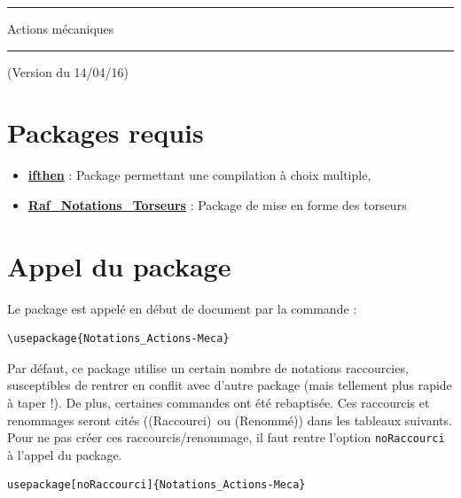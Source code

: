 \documentclass[a4paper,12pt]{article}
\newcommand{\rac}{({\color{red}Raccourci})}
\newcommand{\ren}{({\color{blue}Renommé})}
\begin{document}
	\begin{center}
		\hrule{\Large Actions mécaniques}\\\hrule
	\end{center}

(Version du 14/04/16)

	\section{Packages requis}

	\begin{itemize}
		\item \href{http://www.ctan.org/pkg/ifthen}{\textbf{ifthen}} : Package permettant une compilation à choix multiple,
		\item \href{http://www.ctan.org/pkg/color}{\textbf{Raf\_Notations\_Torseurs}} : Package de mise en forme des torseurs
	\end{itemize}

	\section{Appel du package}

	Le package est appelé en début de document par la commande :
	\begin{verbatim}
\usepackage{Notations_Actions-Meca}
	\end{verbatim}

	Par défaut, ce package utilise un certain nombre de notations raccourcies, susceptibles de rentrer en conflit avec d'autre package (mais tellement plus rapide à taper !).
	De plus, certaines commandes ont été rebaptisée.
	Ces raccourcis et renommages seront cités (\rac\ ou \ren) dans les tableaux suivants.
	Pour ne pas créer ces raccourcis/renommage, il faut rentre l'option \verb!noRaccourci! à l'appel du package.

	\begin{verbatim}
usepackage[noRaccourci]{Notations_Actions-Meca}
	\end{verbatim}
\end{document}

